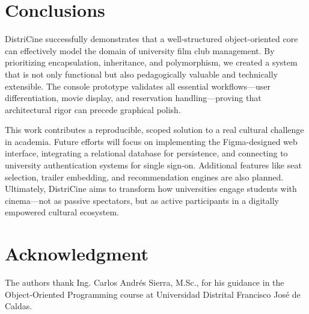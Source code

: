 \documentclass[10pt, conference]{IEEEtran}
\begin{document}
\section{Conclusions}

DistriCine successfully demonstrates that a well-structured object-oriented core can effectively model the domain of university film club management. By prioritizing encapsulation, inheritance, and polymorphism, we created a system that is not only functional but also pedagogically valuable and technically extensible. The console prototype validates all essential workflows—user differentiation, movie display, and reservation handling—proving that architectural rigor can precede graphical polish.

This work contributes a reproducible, scoped solution to a real cultural challenge in academia. Future efforts will focus on implementing the Figma-designed web interface, integrating a relational database for persistence, and connecting to university authentication systems for single sign-on. Additional features like seat selection, trailer embedding, and recommendation engines are also planned. Ultimately, DistriCine aims to transform how universities engage students with cinema—not as passive spectators, but as active participants in a digitally empowered cultural ecosystem.

\section*{Acknowledgment}

The authors thank Ing. Carlos Andrés Sierra, M.Sc., for his guidance in the Object-Oriented Programming course at Universidad Distrital Francisco José de Caldas.



\end{document}
